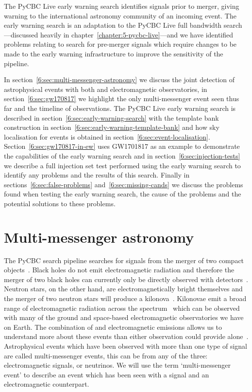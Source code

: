 

The PyCBC Live early warning search identifies \gwadj signals prior to merger, giving warning to the international astronomy community of an incoming \gwadj event. The early warning search is an adaptation to the PyCBC Live full bandwidth search---discussed heavily in chapter~\ref{chapter:5-pycbc-live}---and we have identified problems relating to search for pre-merger signals which require changes to be made to the early warning infrastructure to improve the sensitivity of the pipeline.

In section~\ref{6:sec:multi-messenger-astronomy} we discuss the joint detection of astrophysical events with both \gw and electromagnetic observatories, in section~\ref{6:sec:gw170817} we highlight the only multi-messenger event seen thus far and the timeline of observations. The PyCBC Live early warning search is described in section~\ref{6:sec:early-warning-search} with the template bank construction in section~\ref{6:sec:early-warning-template-bank} and how sky localisation for events is obtained in section~\ref{6:sec:event-localisation}. Section~\ref{6:sec:gw170817-in-ew} uses GW1701817 as an example to demonstrate the capabilities of the early warning search and in section~\ref{6:sec:injection-tests} we describe a full injection set test performed using the early warning search to identify any problems and the results of this search. Finally in sections~\ref{6:sec:false-problems} and~\ref{6:sec:missing-cands} we discuss the problems found when testing the early warning search, the cause of the problems and the potential solutions to these problems.

\section{\label{6:sec:multi-messenger-astronomy}Multi-messenger astronomy}

The PyCBC \gwadj search pipeline searches for \gwadj signals from the merger of two compact objects~\cite{PyCBC:2016}. Black holes do not emit electromagnetic radiation and therefore the merger of two black holes can currently only be directly observed with \gwadj detectors~\cite{Ghez:2000}. Neutron stars, on the other hand, are electromagnetically bright themselves and the merger of two neutron stars will produce a kilonova~\cite{Kilonovae:2017}. Kilonovae emit a broad range of electromagnetic radiation across the spectrum~\cite{kilonova_lightcurve:2017} which can be observed with many of the ground and space-based electromagnetic observatories we have on Earth. The combination of \gw and electromagnetic emissions allows us to understand more about these events than either observation could provide alone~\cite{multi_mess_astro:2019}. Astrophysical events which have been observed with more than one type of signal are called multi-messenger events, this can be from any of the three: electromagnetic signals, \gws or neutrinos. We will use the term `multi-messenger event' to describe an event which has been seen with a \gwadj signal and an electromagnetic counterpart.

